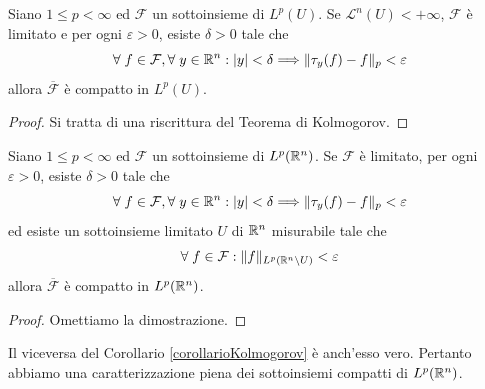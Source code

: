 \begin{corollario}
	Siano $1 \le p < \infty$ ed $\mathcal{F}$ un sottoinsieme di $L^p(U)$. Se $\mathcal{L}^n(U) < +\infty$, $\mathcal{F}$ è limitato e per ogni $\varepsilon > 0$, esiste $\delta > 0$ tale che 
	\[ \forall\; f \in \mathcal{F},\forall\; y \in \mathbb{R}^n: \lvert y\rvert < \delta \Longrightarrow \lVert\tau_{y}(f)-f\rVert_{p} < \varepsilon \]
	allora $\overline{\mathcal{F}}$ è compatto in $L^p(U)$.
\end{corollario}
\begin{proof}
	Si tratta di una riscrittura del Teorema di Kolmogorov.
\end{proof}
\begin{corollario}\label{corollarioKolmogorov}
	Siano $1 \le p < \infty$ ed $\mathcal{F}$ un sottoinsieme di $L^p(\mathbb{R}^n)$. Se $\mathcal{F}$ è limitato, per ogni $\varepsilon > 0$, esiste $\delta > 0$ tale che 
	\[ \forall\; f \in \mathcal{F},\forall\; y \in \mathbb{R}^n: \lvert y\rvert < \delta \Longrightarrow \lVert\tau_{y}(f)-f\rVert_{p} < \varepsilon \]
	ed esiste un sottoinsieme limitato $U$ di $\mathbb{R}^n$ misurabile tale che 
	\[ \forall\; f \in \mathcal{F}: \lVert f\rVert_{L^p(\mathbb{R}^n\setminus U)} < \varepsilon \] 
	allora $\overline{\mathcal{F}}$ è compatto in $L^p(\mathbb{R}^n)$.
\end{corollario}
\begin{proof}
	Omettiamo la dimostrazione.
\end{proof}
\begin{osservazione}
	Il viceversa del Corollario \eqref{corollarioKolmogorov} è anch'esso vero. Pertanto abbiamo una caratterizzazione piena dei sottoinsiemi compatti di $L^p(\mathbb{R}^n)$.
\end{osservazione}

